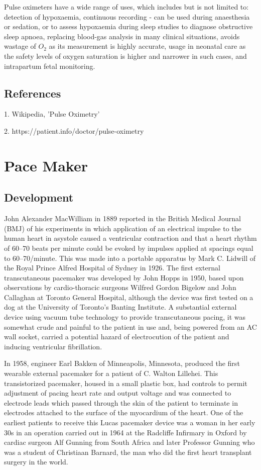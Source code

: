 \documentclass[11pt]{article}
\begin{document}
Pulse oximeters have a wide range of uses, which includes but is not limited to: detection of hypoxaemia, continuous recording - can be used during anaesthesia or sedation, or to assess hypoxaemia during sleep studies to diagnose obstructive sleep apnoea, replacing blood-gas analysis in many clinical situations, avoids wastage of $O_2$ as its measurement is highly accurate, usage in neonatal care as the safety levels of oxygen saturation is higher and narrower in such cases, and intrapartum fetal monitoring.

\subsection*{\centering References}

1. Wikipedia, 'Pulse Oximetry'

2. https://patient.info/doctor/pulse-oximetry

\pagebreak

\section*{\centering Pace Maker}

\subsection*{Development}

John Alexander MacWilliam in 1889 reported in the British Medical Journal (BMJ) of his experiments in which application of an electrical impulse to the human heart in asystole caused a ventricular contraction and that a heart rhythm of 60–70 beats per minute could be evoked by impulses applied at spacings equal to 60–70/minute. This was made into a portable apparatus by Mark C. Lidwill of the Royal Prince Alfred Hospital of Sydney in 1926. The first external transcutaneous pacemaker was developed by John Hopps in 1950, based upon observations by cardio-thoracic surgeons Wilfred Gordon Bigelow and John Callaghan at Toronto General Hospital, although the device was first tested on a dog at the University of Toronto's Banting Institute. A substantial external device using vacuum tube technology to provide transcutaneous pacing, it was somewhat crude and painful to the patient in use and, being powered from an AC wall socket, carried a potential hazard of electrocution of the patient and inducing ventricular fibrillation.

In 1958, engineer Earl Bakken of Minneapolis, Minnesota, produced the first wearable external pacemaker for a patient of C. Walton Lillehei. This transistorized pacemaker, housed in a small plastic box, had controls to permit adjustment of pacing heart rate and output voltage and was connected to electrode leads which passed through the skin of the patient to terminate in electrodes attached to the surface of the myocardium of the heart. One of the earliest patients to receive this Lucas pacemaker device was a woman in her early 30s in an operation carried out in 1964 at the Radcliffe Infirmary in Oxford by cardiac surgeon Alf Gunning from South Africa and later Professor Gunning who was a student of Christiaan Barnard, the man who did the first heart transplant surgery in the world. 
\end{document}
